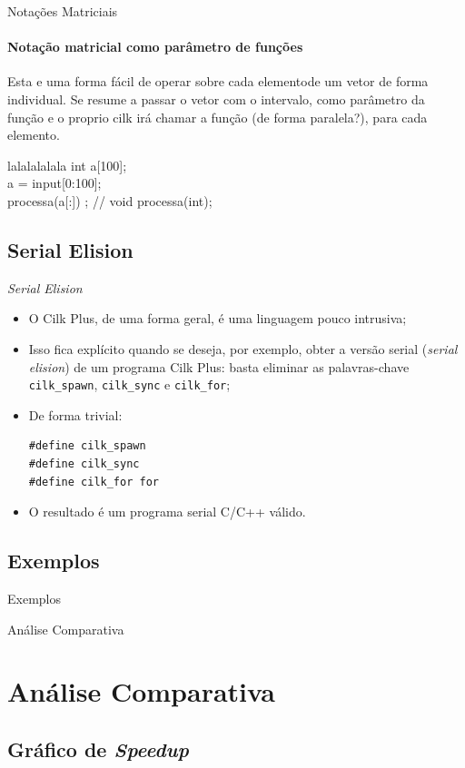 \documentclass{beamer}
\begin{document}
\begin{frame}[fragile]{Notações Matriciais}
\framesubtitle{Notação matricial como parâmetro de funções}
   Esta e uma forma fácil de operar sobre cada elementode um vetor de forma
   individual. Se resume a passar o vetor com o intervalo, como parâmetro da função
   e o proprio cilk irá chamar a função (de forma paralela?), para cada elemento.
\begin{scriptsize}
\begin{block}{lalalalalala} 
    int a[100];        \\
    a = input[0:100];\\
   processa(a[:]) ;  // void processa(int);\\
\end{block}
\end{scriptsize}
\end{frame}

\subsection{Serial Elision}
\begin{frame}[fragile]{\textit{Serial Elision}}
\begin{itemize}
    \item O Cilk Plus, de uma forma geral, é uma linguagem pouco intrusiva;
    \item Isso fica explícito quando se deseja, por exemplo, obter a versão
    serial (\textit{serial elision}) de um programa Cilk Plus: basta eliminar as
    palavras-chave \texttt{cilk\_spawn}, \texttt{cilk\_sync} e
    \texttt{cilk\_for};
    \item De forma trivial:
\begin{lstlisting}
#define cilk_spawn
#define cilk_sync
#define cilk_for for
\end{lstlisting}
    \item O resultado é um programa serial C/C++ válido.
\end{itemize}
\end{frame}

\subsection{Exemplos}
\begin{frame}{Exemplos}
\end{frame}

\begin{frame}{Análise Comparativa}
\section{Análise Comparativa}
\subsection{Gráfico de \protect\textit{Speedup}}
\end{frame}
\end{document}
